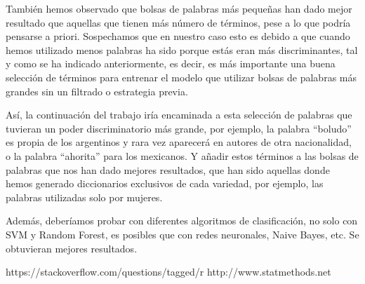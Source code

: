 \documentclass[11pt,a4paper]{article}
\begin{document}
También hemos observado que bolsas de palabras más pequeñas han dado mejor resultado que aquellas que tienen más número de términos, pese a lo que  podría pensarse a priori. Sospechamos que en nuestro caso esto es debido a que cuando hemos utilizado menos palabras ha sido porque estás eran más discriminantes, tal y como se ha indicado anteriormente, es decir, es más importante una buena selección de términos para entrenar el modelo que utilizar bolsas de palabras más grandes sin un filtrado o estrategia previa.

Así, la continuación del trabajo iría encaminada a esta selección de palabras que tuvieran un poder discriminatorio más grande, por ejemplo, la palabra “boludo” es propia de los argentinos y rara vez aparecerá en autores de otra nacionalidad, o la palabra “ahorita” para los mexicanos. Y añadir estos términos a las bolsas de palabras que nos han dado mejores resultados, que han sido aquellas donde hemos generado diccionarios exclusivos de cada variedad, por ejemplo, las palabras utilizadas solo por mujeres.

Además, deberíamos probar con diferentes algoritmos de clasificación, no solo con SVM y Random Forest, es posibles que con redes neuronales, Naive Bayes, etc. Se obtuvieran mejores resultados.


\begin{thebibliography}{}

https://stackoverflow.com/questions/tagged/r \newline
http://www.statmethods.net\newline

\end{thebibliography}
\end{document}
